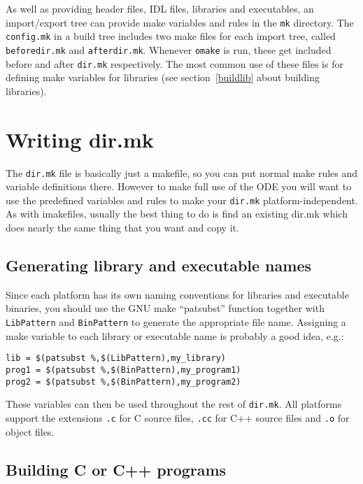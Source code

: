 \documentclass[11pt,twoside,onecolumn]{article}
\begin{document}
As well as providing header files, IDL files, libraries and executables, an
import/export tree can provide make variables and rules in the {\tt mk}
directory.  The {\tt config.mk} in a build tree includes two make files for
each import tree, called {\tt beforedir.mk} and {\tt afterdir.mk}.  Whenever
{\tt omake} is run, these get included before and after {\tt dir.mk}
respectively.  The most common use of these files is for defining make
variables for libraries (see section~\ref{buildlib} about building libraries).


\section{Writing dir.mk}

The {\tt dir.mk} file is basically just a makefile, so you can put normal make
rules and variable definitions there.  However to make full use of the ODE you
will want to use the predefined variables and rules to make your {\tt dir.mk}
platform-independent.  As with imakefiles, usually the best thing to do is find
an existing dir.mk which does nearly the same thing that you want and copy it.

\subsection{Generating library and executable names}

Since each platform has its own naming conventions for libraries and executable
binaries, you should use the GNU make ``patsubst'' function together with {\tt
LibPattern} and {\tt BinPattern} to generate the appropriate file name.
Assigning a make variable to each library or executable name is probably a good
idea, e.g.:

{\footnotesize \begin{verbatim}
lib = $(patsubst %,$(LibPattern),my_library)
prog1 = $(patsubst %,$(BinPattern),my_program1)
prog2 = $(patsubst %,$(BinPattern),my_program2)
\end{verbatim}}

These variables can then be used throughout the rest of {\tt dir.mk}.  All
platforms support the extensions {\tt .c} for C source files, {\tt .cc} for C++
source files and {\tt .o} for object files.

\subsection{Building C or C++ programs}
\end{document}
